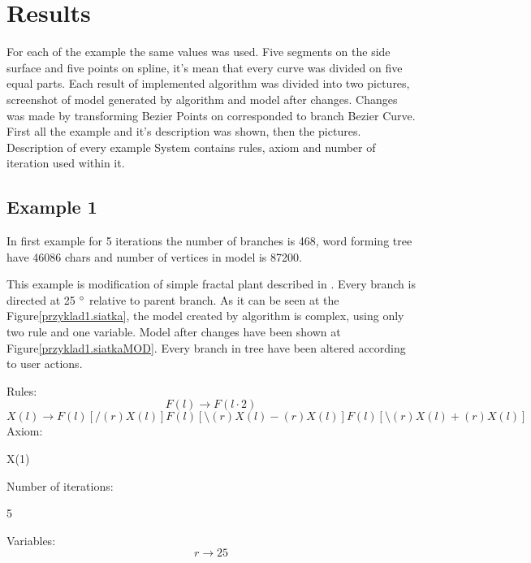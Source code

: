 \documentclass[b5paper,twoside,11pt]{article}
\renewcommand{\figurename}{Figure}
\begin{document}
\section{Results}
For each of the example the same values was used. Five segments on the side surface and five points on spline, it's mean that every curve was divided on five equal parts. Each result of implemented algorithm was divided into two pictures, screenshot of model generated by algorithm and model after changes. Changes was made by transforming Bezier Points on corresponded to branch Bezier Curve. First all the example and it's description was shown, then the pictures. Description of every example System contains rules, axiom and number of iteration used within it.
\subsection*{Example 1}
In first example for 5 iterations the number of branches is 468, word forming tree have 46086 chars and number of vertices in model is 87200.\par
This example is modification of simple fractal plant described in \cite{prusinABOP}.
Every branch is directed at 25  $\degree$ relative to parent branch. As it can be seen at the \figurename \ref{przyklad1.siatka}, the model created by algorithm is complex, using only two rule and one variable. Model after changes have been shown at  \figurename \ref{przyklad1.siatkaMOD}. Every branch in tree have been altered according to user actions.\par 
Rules: \newline
\begin{equation*}
F(l)\rightarrow F(l\cdot2) 
\end{equation*}
\begin{equation*}
X(l) \rightarrow F(l)[/(r)X(l)]F(l)[\setminus(r)X(l)-(r)X(l)]F(l)[\setminus(r)X(l)+(r)X(l)] 
\end{equation*}
Axiom:
\begin{center}
X(1)
\end{center}
Number of iterations:
\begin{center}
5
\end{center}
Variables:
\begin{equation*}
r\rightarrow 25
\end{equation*}
\end{document}
